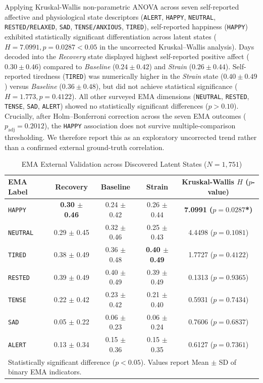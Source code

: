 \documentclass[conference]{IEEEtran}
\begin{document}
Applying Kruskal-Wallis non-parametric ANOVA across seven self-reported affective and physiological state descriptors (\texttt{ALERT}, \texttt{HAPPY}, \texttt{NEUTRAL}, \texttt{RESTED/RELAXED}, \texttt{SAD}, \texttt{TENSE/ANXIOUS}, \texttt{TIRED}), self-reported happiness (\texttt{HAPPY}) exhibited statistically significant differentiation across latent states ($H = 7.0991, p = 0.0287 < 0.05$ in the uncorrected Kruskal--Wallis analysis). Days decoded into the \textit{Recovery} state displayed highest self-reported positive affect ($0.30 \pm 0.46$) compared to \textit{Baseline} ($0.24 \pm 0.42$) and \textit{Strain} ($0.26 \pm 0.44$). Self-reported tiredness (\texttt{TIRED}) was numerically higher in the \textit{Strain} state ($0.40 \pm 0.49$) versus \textit{Baseline} ($0.36 \pm 0.48$), but did not achieve statistical significance ($H = 1.773, p = 0.4122$). All other surveyed EMA dimensions (\texttt{NEUTRAL}, \texttt{RESTED}, \texttt{TENSE}, \texttt{SAD}, \texttt{ALERT}) showed no statistically significant differences ($p > 0.10$). Crucially, after Holm--Bonferroni correction across the seven EMA outcomes ($p_{\text{adj}} = 0.2012$), the \texttt{HAPPY} association does not survive multiple-comparison thresholding. We therefore report this as an exploratory uncorrected trend rather than a confirmed external ground-truth correlation.

\begin{table}[t]
\caption{EMA External Validation across Discovered Latent States ($N=1,751$)}
\label{tab:ema_validation}
\centering
\begin{tabular}{lcccc}
\toprule
\textbf{EMA Label} & \textbf{Recovery} & \textbf{Baseline} & \textbf{Strain} & \textbf{Kruskal-Wallis $H$ ($p$-value)} \\
\midrule
\texttt{HAPPY} & \textbf{0.30 $\pm$ 0.46} & 0.24 $\pm$ 0.42 & 0.26 $\pm$ 0.44 & \textbf{7.0991 ($p = 0.0287$*)} \\
\texttt{NEUTRAL} & 0.29 $\pm$ 0.45 & 0.32 $\pm$ 0.46 & 0.25 $\pm$ 0.43 & 4.4498 ($p = 0.1081$) \\
\texttt{TIRED} & 0.38 $\pm$ 0.49 & 0.36 $\pm$ 0.48 & \textbf{0.40 $\pm$ 0.49} & 1.7727 ($p = 0.4122$) \\
\texttt{RESTED} & 0.39 $\pm$ 0.49 & 0.40 $\pm$ 0.49 & 0.39 $\pm$ 0.49 & 0.1313 ($p = 0.9365$) \\
\texttt{TENSE} & 0.22 $\pm$ 0.42 & 0.23 $\pm$ 0.42 & 0.21 $\pm$ 0.40 & 0.5931 ($p = 0.7434$) \\
\texttt{SAD} & 0.05 $\pm$ 0.22 & 0.06 $\pm$ 0.23 & 0.06 $\pm$ 0.24 & 0.7606 ($p = 0.6837$) \\
\texttt{ALERT} & 0.13 $\pm$ 0.34 & 0.15 $\pm$ 0.36 & 0.15 $\pm$ 0.35 & 0.6127 ($p = 0.7361$) \\
\bottomrule
\multicolumn{5}{l}{\footnotesize *Statistically significant difference ($p < 0.05$). Values report Mean $\pm$ SD of binary EMA indicators.}
\end{tabular}
\end{table}
\end{document}
